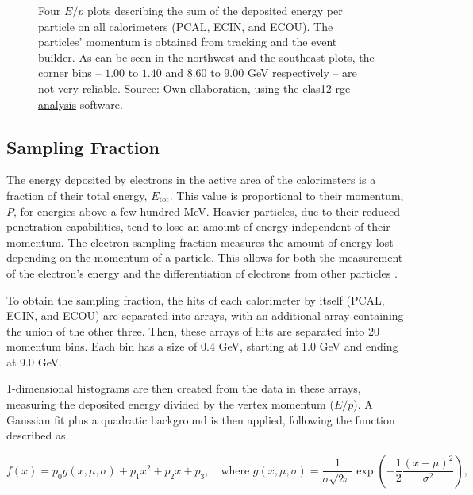     \begin{figure}[b!]
        \centering{}
        \caption[Calorimeters $E/p$ plots]{Four $E/p$ plots describing the sum of the deposited energy per particle on all calorimeters (PCAL, ECIN, and ECOU).
        The particles' momentum is obtained from tracking and the event builder.
        As can be seen in the northwest and the southeast plots, the corner bins -- $1.00$ to $1.40$ and $8.60$ to $9.00$ GeV respectively -- are not very reliable.
        Source: Own ellaboration, using the \hyperlink{github.com/bleaktwig/clas12-rge-analysis}{clas12-rge-analysis} software.}
        \label{fig::sf_1d}
    \end{figure}

\subsection{Sampling Fraction}
\label{ssec::sampling_fraction}
    The energy deposited by electrons in the active area of the calorimeters is a fraction of their total energy, $E_\text{tot}$.
    This value is proportional to their momentum, $P$, for energies above a few hundred MeV.
    Heavier particles, due to their reduced penetration capabilities, tend to lose an amount of energy independent of their momentum.
    The electron sampling fraction measures the amount of energy lost depending on the momentum of a particle.
    This allows for both the measurement of the electron's energy and the differentiation of electrons from other particles \cite{wigmans2000}.

    To obtain the sampling fraction, the hits of each calorimeter by itself (PCAL, ECIN, and ECOU) are separated into arrays, with an additional array containing the union of the other three.
    Then, these arrays of hits are separated into 20 momentum bins.
    Each bin has a size of 0.4 GeV, starting at 1.0 GeV and ending at 9.0 GeV.

    1-dimensional histograms are then created from the data in these arrays, measuring the deposited energy divided by the vertex momentum ($E/p$).
    A Gaussian fit plus a quadratic background is then applied, following the function described as

    \begin{equation*}
        f(x) = p_0 g(x, \mu, \sigma) + p_1 x^2 + p_2 x + p_3, \hspace{12pt}
        \text{where} \hspace{4pt}
        g(x, \mu, \sigma) = \frac{1}{\sigma \sqrt{2\pi}} \exp \left(-\frac{1}{2} \frac{(x - \mu)^2}{\sigma^2}\right),
    \end{equation*}

